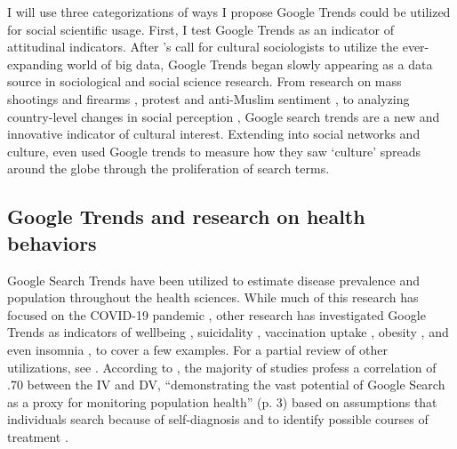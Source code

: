 I will use three categorizations of ways I propose Google Trends could be
utilized for social scientific usage. First, I test Google Trends as an
indicator of attitudinal indicators. After
\citet{bailCulturalEnvironmentMeasuring2014}'s call for cultural sociologists to
utilize the ever-expanding world of big data, Google Trends began slowly
appearing as a data source in sociological and social science research. From
research on mass shootings and firearms
\citep{brownsteinInternetSearchPatterns2020, semenzaInformationseekingWakeTragedy2020},
protest and anti-Muslim sentiment
\citep{bailUsingInternetSearch2018,barrieSearchingRacismGeorge2020,grossThereFergusonEffect2017},
to analyzing country-level changes in social perception \citep{reyes_etal18},
Google search trends are a new and innovative indicator of cultural interest.
Extending into social networks and culture,
\citet{bailPrestigeProximityPrejudice2019} even used Google trends to measure
how they saw `culture' spreads around the globe through the proliferation of
search terms.

\subsection{Google Trends and research on health behaviors}

Google Search Trends have been utilized to estimate disease prevalence and
population throughout the health sciences. While much of this research has
focused on the COVID-19 pandemic \citep{jimenez_etal20,
jimenezCOVID19SymptomGoogle2020, limEstimatingInformationSeekingBehaviour2020,
mavraganiCOVID19PredictabilityUnited2020, nguyenGoogleTrendsAnalysis2020,
todorovaInternetBasedData2021, mingUnderstandingHealthCommunication2021}, other
research has investigated Google Trends as indicators of wellbeing
\citep{brodeurCOVID19LockdownsWellbeing2021,
carpiTwitterSubjectiveWellBeing2020, duCOVID19IncreasesOnline2020}, suicidality
\citep{burnettTimeTrendsPublic2020}, vaccination uptake
\citep{dalumhansenEnsembleLearnedVaccination2016}, obesity
\citep{sarigulNowcastingObesityUsing2014}, and even insomnia
\citep{zittingGoogleTrendsReveal2020}, to cover a few examples. For a partial
review of other utilizations, see \citet{nutiUseGoogleTrends2014}. According to
\citet{jaidkaInformationseekingVsSharing2021}, the majority of studies profess a
correlation of \> .70 between the IV and DV, ``demonstrating the vast potential
of Google Search as a proxy for monitoring population health'' (p. 3) based on
assumptions that individuals search because of self-diagnosis and to identify
possible courses of treatment \citep{dechoudhurySeekingSharingHealth2014}.


